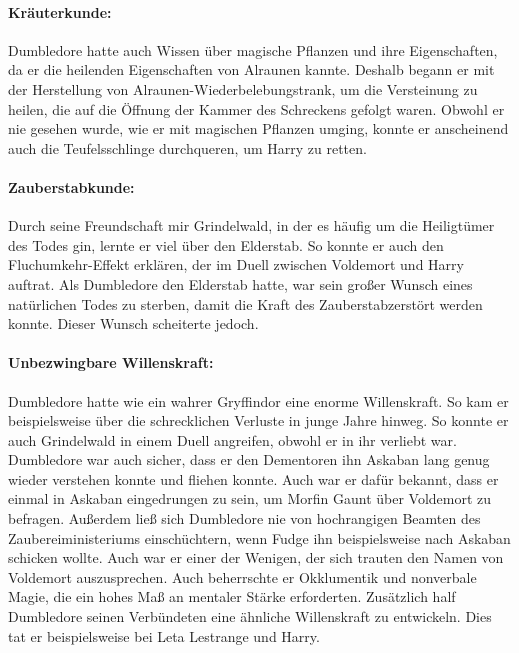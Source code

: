 \documentclass[a4paper, 10pt]{article}
\begin{document}
\paragraph{Kräuterkunde:}
Dumbledore hatte auch Wissen über magische Pflanzen und ihre Eigenschaften, da er die heilenden Eigenschaften von Alraunen kannte. Deshalb begann er mit der Herstellung von Alraunen-Wiederbelebungstrank, um die Versteinung zu heilen, die auf die Öffnung der Kammer des Schreckens gefolgt waren. Obwohl er nie gesehen wurde, wie er mit magischen Pflanzen umging, konnte er anscheinend auch die Teufelsschlinge durchqueren, um Harry zu retten.
\paragraph{Zauberstabkunde:}
Durch seine Freundschaft mir Grindelwald, in der es häufig um die Heiligtümer des Todes gin, lernte er viel über den Elderstab. So konnte er auch den Fluchumkehr-Effekt erklären, der im Duell zwischen Voldemort und Harry auftrat. Als Dumbledore den Elderstab hatte, war sein großer Wunsch eines natürlichen Todes zu sterben, damit die Kraft des Zauberstabzerstört werden konnte. Dieser Wunsch scheiterte jedoch.
\paragraph{Unbezwingbare Willenskraft:}
Dumbledore hatte wie ein wahrer Gryffindor eine enorme Willenskraft. So kam er beispielsweise über die schrecklichen Verluste in junge Jahre hinweg. So konnte er auch Grindelwald in einem Duell angreifen, obwohl er in ihr verliebt war. Dumbledore war auch sicher, dass er den Dementoren ihn Askaban lang genug wieder verstehen konnte und fliehen konnte. Auch war er dafür bekannt, dass er einmal in Askaban eingedrungen zu sein, um Morfin Gaunt über Voldemort zu befragen. Außerdem ließ sich Dumbledore nie von hochrangigen Beamten des Zaubereiministeriums einschüchtern, wenn Fudge ihn beispielsweise nach Askaban schicken wollte. Auch war er einer der Wenigen, der sich trauten den Namen von Voldemort auszusprechen. Auch beherrschte er Okklumentik und nonverbale Magie, die ein hohes Maß an mentaler Stärke erforderten. Zusätzlich half Dumbledore seinen Verbündeten eine ähnliche Willenskraft zu entwickeln. Dies tat er beispielsweise bei Leta Lestrange und Harry.
\end{document}

